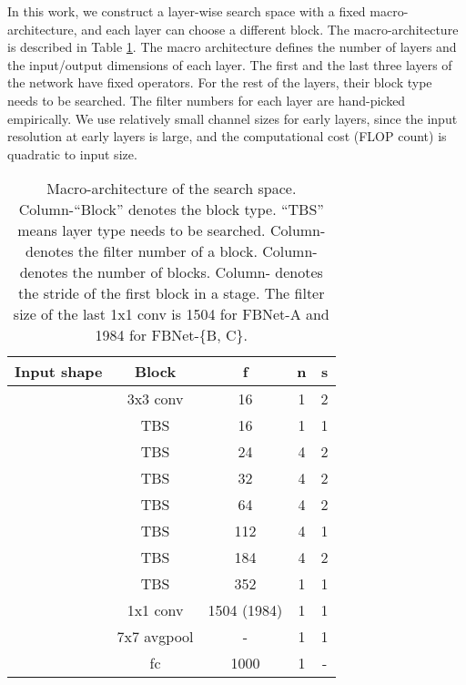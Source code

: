 \documentclass[10pt,twocolumn,letterpaper]{article}
\begin{document}
In this work, we construct a layer-wise search space with a fixed macro-architecture, and each layer can choose a different block. The macro-architecture is described in Table \ref{tab:macro-space}. The macro architecture defines the number of layers and the input/output dimensions of each layer. The first and the last three layers of the network have fixed operators. For the rest of the layers, their block type needs to be searched. The filter numbers for each layer are hand-picked empirically. We use relatively small channel sizes for early layers, since the input resolution at early layers is large, and the computational cost (FLOP count) is quadratic to input size. 

\begin{table}[h]
\centering
\begin{tabular}{c|c|c|c|c}
\hline
Input shape             & Block       & f         & n        & s \\ \hline
        & 3x3 conv    & 16        & 1        & 2      \\
       & TBS         & 16        & 1        & 1      \\
       & TBS         & 24        & 4        & 2      \\
        & TBS         & 32        & 4        & 2      \\
        & TBS         & 64        & 4        & 2      \\
        & TBS         & 112       & 4        & 1      \\
       & TBS         & 184       & 4        & 2      \\
        & TBS         & 352       & 1        & 1      \\
        & 1x1 conv    & 1504 (1984)      & 1        & 1      \\
       & 7x7 avgpool & -         & 1        & 1      \\
                  & fc          & 1000      & 1        & -      \\ \hline
\end{tabular}
\caption{Macro-architecture of the search space. Column-``Block'' denotes the block type. ``TBS'' means layer type needs to be searched. Column- denotes the filter number of a block. Column- denotes the number of blocks. Column- denotes the stride of the first block in a stage.  The filter size of the last 1x1 conv is 1504 for FBNet-A and 1984 for FBNet-\{B, C\}.}
\label{tab:macro-space}
\end{table}
\end{document}
